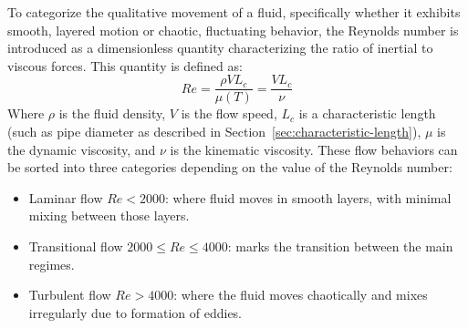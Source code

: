 
To categorize the qualitative movement of a fluid, specifically whether it exhibits smooth, layered motion or chaotic, fluctuating behavior, the Reynolds number is introduced as a dimensionless quantity characterizing the ratio of inertial to viscous forces.
This quantity is defined as:
\begin{equation}
	Re = \frac{\rho V L_c}{\mu(T)} = \frac{V L_c}{\nu}
	\label{eq:reynolds-number}
\end{equation}
Where $\rho$ is the fluid density, $V$ is the flow speed, $L_c$ is a characteristic length (such as pipe diameter as described in Section~\ref{sec:characteristic-length}), $\mu$ is the dynamic viscosity, and $\nu$ is the kinematic viscosity.
These flow behaviors can be sorted into three categories depending on the value of the Reynolds number:
\cite{Cengel2017, anderson2021modern}
\begin{itemize}
	\item Laminar flow $Re < 2000$: where fluid moves in smooth layers, with minimal mixing between those layers.
	\item Transitional flow $2000 \le Re \le 4000$: marks the transition between the main regimes.
	\item Turbulent flow $Re > 4000$: where the fluid moves chaotically and mixes irregularly due to formation of eddies.
\end{itemize}
